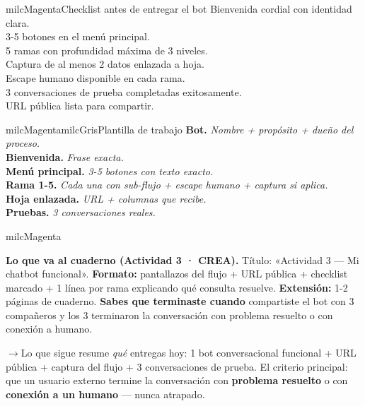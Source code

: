 \documentclass[11pt,letterpaper]{article}
\newcommand{\puente}[1]{%
  \begin{puentebox}%
    \textcolor{milcGradeDark}{$\rightarrow$}\hspace{2mm}#1%
  \end{puentebox}%
}
\newcommand{\checkbox}{\textcolor{milcGradeDark}{\fbox{\phantom{x}}}\hspace{5pt}}
\begin{document}
\begin{drawbox}{milcMagenta}{Checklist antes de entregar el bot}
\checkbox Bienvenida cordial con identidad clara. \\[1mm] \checkbox 3-5 botones en el menú principal. \\[1mm] \checkbox 5 ramas con profundidad máxima de 3 niveles. \\[1mm] \checkbox Captura de al menos 2 datos enlazada a hoja. \\[1mm] \checkbox Escape humano disponible en cada rama. \\[1mm] \checkbox 3 conversaciones de prueba completadas exitosamente. \\[1mm] \checkbox URL pública lista para compartir.
\end{drawbox}

\begin{softbox}{milcMagenta}{milcGris}{Plantilla de trabajo}
\textbf{Bot.} \textit{Nombre + propósito + dueño del proceso.} \\[1mm] \textbf{Bienvenida.} \textit{Frase exacta.} \\[1mm] \textbf{Menú principal.} \textit{3-5 botones con texto exacto.} \\[1mm] \textbf{Rama 1-5.} \textit{Cada una con sub-flujo + escape humano + captura si aplica.} \\[1mm] \textbf{Hoja enlazada.} \textit{URL + columnas que recibe.} \\[1mm] \textbf{Pruebas.} \textit{3 conversaciones reales.}
\end{softbox}

\begin{infoband}{milcMagenta}


\textbf{Lo que va al cuaderno (Actividad 3 · CREA).} Título: «Actividad 3 --- Mi chatbot funcional». \textbf{Formato:} pantallazos del flujo + URL pública + checklist marcado + 1 línea por rama explicando qué consulta resuelve. \textbf{Extensión:} 1-2 páginas de cuaderno. \textbf{Sabes que terminaste cuando} compartiste el bot con 3 compañeros y los 3 terminaron la conversación con problema resuelto o con conexión a humano.
\end{infoband}

\puente{Lo que sigue resume \emph{qué} entregas hoy: 1 bot conversacional funcional + URL pública + captura del flujo + 3 conversaciones de prueba. El criterio principal: que un usuario externo termine la conversación con \textbf{problema resuelto} o con \textbf{conexión a un humano} --- nunca atrapado.}
\end{document}
